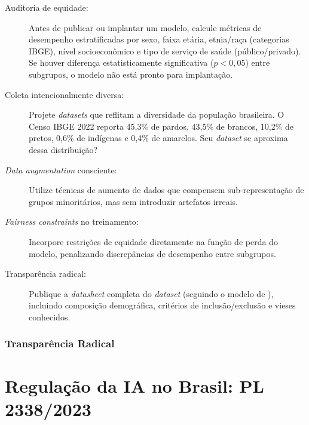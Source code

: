 \begin{description}
  \item[Auditoria de equidade:] Antes de publicar ou implantar um modelo,
    calcule métricas de desempenho estratificadas por sexo, faixa etária,
    etnia/raça (categorias IBGE), nível socioeconômico e tipo de serviço de
    saúde (público/privado). Se houver diferença estatisticamente significativa
    ($p < 0,05$) entre subgrupos, o modelo não está pronto para implantação.

  \item[Coleta intencionalmente diversa:] Projete \textit{datasets} que reflitam
    a diversidade da população brasileira. O Censo IBGE 2022 reporta 45,3\% de
    pardos, 43,5\% de brancos, 10,2\% de pretos, 0,6\% de indígenas e 0,4\% de
    amarelos. Seu \textit{dataset} se aproxima dessa distribuição?

  \item[\textit{Data augmentation} consciente:] Utilize técnicas de aumento de
    dados que compensem sub-representação de grupos minoritários, mas sem
    introduzir artefatos irreais.

  \item[\textit{Fairness constraints} no treinamento:] Incorpore restrições de
    equidade diretamente na função de perda do modelo, penalizando
    discrepâncias de desempenho entre subgrupos.

  \item[Transparência radical:] Publique a \textit{datasheet} completa do
    \textit{dataset} (seguindo o modelo de \cite{gebru2021datasheets}),
    incluindo composição demográfica, critérios de inclusão/exclusão e vieses
    conhecidos.
\end{description}

\subsubsection{Transparência Radical}


\section{Regulação da IA no Brasil: PL 2338/2023}
\label{sec:pl-2338}

\nivelquatro

